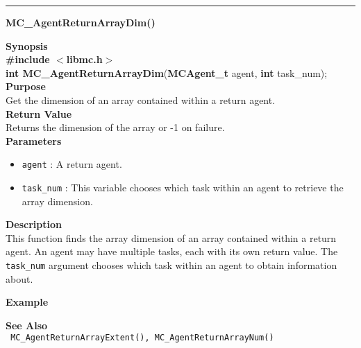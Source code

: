 \noindent
\vspace{5pt}
\rule{6.5in}{0.015in}
\noindent
{}
{\LARGE \bf MC\_AgentReturnArrayDim()}\\
\label{api:MC_AgentReturnArrayDim()}

\noindent
{\bf Synopsis}\\
{\bf \#include $<$libmc.h$>$}\\
{\bf int MC\_AgentReturnArrayDim}({\bf MCAgent\_t} agent, {\bf int} task\_num);\\

\noindent
{\bf Purpose}\\
Get the dimension of an array contained within a return agent.\\

\noindent
{\bf Return Value}\\
Returns the dimension of the array or -1 on failure.\\

\noindent
{\bf Parameters}
\begin{itemize}
\item \texttt{agent} : A return agent.
\item \texttt{task\_num} : This variable chooses which task within an agent to
retrieve the array dimension.
\end{itemize}


\noindent
{\bf Description}\\
This function finds the array dimension of an array contained within a return
agent. An agent may have multiple tasks, each with its own return value. The
\texttt{task\_num} argument chooses which task within an agent to obtain
information about.

\noindent
{\bf Example}\\
\noindent
{\footnotesize}

\noindent
{\bf See Also}\\
\texttt{
  MC\_AgentReturnArrayExtent(), MC\_AgentReturnArrayNum()
}

